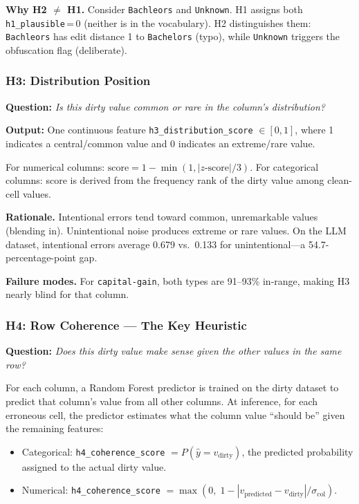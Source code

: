 \documentclass[11pt,a4paper]{article}
\newcommand{\feat}[1]{\texttt{#1}}
\begin{document}
\textbf{Why H2 $\neq$ H1.}
Consider \texttt{Bachleors} and \texttt{Unknown}.  H1 assigns both
\feat{h1\_plausible}\,=\,0 (neither is in the vocabulary).  H2 distinguishes
them: \texttt{Bachleors} has edit distance 1 to \texttt{Bachelors} (typo),
while \texttt{Unknown} triggers the obfuscation flag (deliberate).

\subsubsection{H3: Distribution Position}

\textbf{Question:} \emph{Is this dirty value common or rare in the column's distribution?}

\textbf{Output:} One continuous feature \feat{h3\_distribution\_score}
$\in [0,1]$, where 1 indicates a central/common value and 0 indicates an
extreme/rare value.

For numerical columns: $\text{score} = 1 - \min(1, |z\text{-score}| / 3)$.
For categorical columns: score is derived from the frequency rank of the
dirty value among clean-cell values.

\textbf{Rationale.}
Intentional errors tend toward common, unremarkable values (blending in).
Unintentional noise produces extreme or rare values.  On the LLM dataset,
intentional errors average 0.679 vs.\ 0.133 for unintentional---a
54.7-percentage-point gap.

\textbf{Failure modes.}
For \texttt{capital-gain}, both types are 91--93\% in-range, making H3
nearly blind for that column.

\subsubsection{H4: Row Coherence --- The Key Heuristic}

\textbf{Question:} \emph{Does this dirty value make sense given the other
values in the same row?}

For each column, a Random Forest predictor is trained on the dirty dataset to
predict that column's value from all other columns.  At inference, for each
erroneous cell, the predictor estimates what the column value ``should be''
given the remaining features:
\begin{itemize}[nosep]
  \item Categorical: \feat{h4\_coherence\_score} $= P(\hat{y} = v_{\text{dirty}})$,
        the predicted probability assigned to the actual dirty value.
  \item Numerical: \feat{h4\_coherence\_score} $= \max(0,\; 1 - |v_{\text{predicted}} - v_{\text{dirty}}| / \sigma_{\text{col}})$.
\end{itemize}
\end{document}
